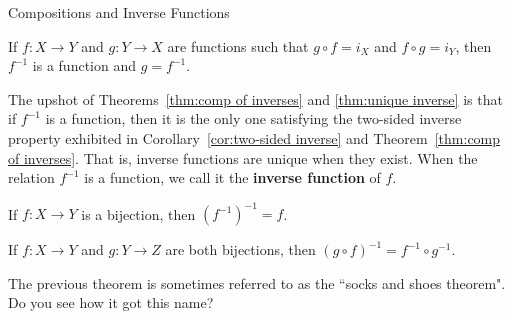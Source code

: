 \begin{section}{Compositions and Inverse Functions}
\begin{theorem}\label{thm:unique inverse}
If $f:X\to Y$ and $g:Y\to X$ are functions such that $g\circ f=i_X$ and $f\circ g=i_Y$, then $f^{-1}$ is a function and $g=f^{-1}$.
\end{theorem}

The upshot of Theorems~\ref{thm:comp of inverses} and \ref{thm:unique inverse} is that if $f^{-1}$ is a function, then it is the only one satisfying the two-sided inverse property exhibited in Corollary~\ref{cor:two-sided inverse} and Theorem~\ref{thm:comp of inverses}. That is, inverse functions are unique when they exist. When the relation $f^{-1}$ is a function, we call it the \textbf{inverse function} of $f$.

\begin{theorem}
If $f:X\to Y$ is a bijection, then $(f^{-1})^{-1}=f$.
\end{theorem}

\begin{theorem}
If $f:X\to Y$ and $g:Y\to Z$ are both bijections, then $(g\circ f)^{-1}=f^{-1}\circ g^{-1}$.
\end{theorem}

The previous theorem is sometimes referred to as the ``socks and shoes theorem".  Do you see how it got this name?

\end{section}
